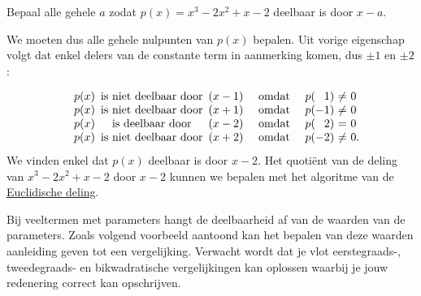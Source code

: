 \documentclass{ximera}
\begin{document}
\begin{example} 
	Bepaal alle gehele $a$ zodat  $p(x) =x^3-2x^2+x-2$ deelbaar is door $x-a$.
		
	We moeten dus alle gehele nulpunten van $p(x)$ bepalen. Uit vorige eigenschap volgt dat enkel delers van de constante term in aanmerking komen, dus $\pm1$ en $\pm2$:
		
	\renewcommand{\bullet}{}   %
	\[
	\begin{array}{lr@{\,}c@{\,}lcl@{}c@{}r@{}c@{\ }c@{\ }l}
	\bullet&p(x)&\textrm{ is niet deelbaar door }  &(x-1)&\textrm{ omdat }&p&(& 1&)&\neq   &0\\
	\bullet&p(x)&\textrm{ is niet deelbaar door }  &(x+1)&\textrm{ omdat }&p&(&-1&)&\neq   &0\\
	\bullet&p(x)&\textrm{ is deelbaar door }    &(x-2)&\textrm{ omdat }&p&(& 2&)&=   &0\\
	\bullet&p(x)&\textrm{ is niet deelbaar door }    &(x+2)&\textrm{ omdat }&p&(&-2&)&\neq   &0.
	\end{array}
	\]
	We vinden enkel dat $p(x)$ deelbaar is door $x-2$. Het quotiënt van de deling van $x^3-2x^2+x-2$ door $x-2$ kunnen we bepalen met het algoritme van de \hyperref[euclidische deling: algoritme]{Euclidische deling}.
\end{example}







Bij veeltermen met parameters hangt de deelbaarheid af van de waarden van de parameters. Zoals volgend voorbeeld aantoond kan het bepalen van deze waarden aanleiding geven tot een vergelijking. Verwacht wordt dat je vlot eerstegraads-, tweedegraads- en bikwadratische vergelijkingen kan oplossen waarbij je jouw redenering correct kan opschrijven. 
\end{document}
